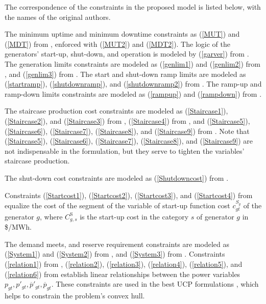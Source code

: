 The correspondence of the constraints in the proposed model is listed below, with the names of the original authors.



The minimum uptime and minimum downtime constraints as (\ref{MUT}) and (\ref{MDT}) from \citet{Rajan2005}, enforced with (\ref{MUT2}) and (\ref{MDT2}). The logic of the generators' start-up, shut-down, and operation is modeled by (\ref{garver}) from \citet{Garver1962}. The generation limits constraints are modeled as (\ref{genlim1}) and (\ref{genlim2}) from \citet{Gentile2017}, and (\ref{genlim3}) from \citet{Pan2016}. The start and shut-down ramp limits are modeled as (\ref{startramp}), (\ref{shutdownramp}), and (\ref{shutdownramp2}) from \citet{Morales-Espania2013}. The ramp-up and ramp-down limits constraints are modeled as (\ref{rampup}) and (\ref{rampdown}) from \citet{Damci-Kurt2016}.

The staircase production cost constraints are modeled as (\ref{Staircase1}), (\ref{Staircase2}), and (\ref{Staircase3}) from \citet{Garver1962}, (\ref{Staircase4}) from \citet{Wu2016}, and (\ref{Staircase5}), (\ref{Staircase6}), (\ref{Staircase7}), (\ref{Staircase8}), and (\ref{Staircase9}) from \citet{Knueven2018b}. Note that (\ref{Staircase5}), (\ref{Staircase6}), (\ref{Staircase7}), (\ref{Staircase8}), and (\ref{Staircase9}) are not indispensable in the formulation, but they serve to tighten the variables' staircase production.

The shut-down cost constraints are modeled as (\ref{Shutdowncost}) from \citet{Knueven2020b}.

Constraints (\ref{Startcost1}), (\ref{Startcost2}), (\ref{Startcost3}), and (\ref{Startcost4}) from \citet{Morales-Espania2013} equalize the cost of the segment of the variable of start-up function cost $c_{gt}^{S_g}$ of the generator $g$, where $C_{g,s}^{\text{S}}$ is the start-up cost in the category $s$ of generator $g$ in \$/MWh.

The demand meets, and reserve requirement constraints are modeled as (\ref{System1}) and (\ref{System2}) from \citet{Ostrowski2012}, and (\ref{System3}) from \citet{Morales-Espania2013}. Constraints (\ref{relation1}) from \citet{Morales-Espania2013}, (\ref{relation2}), (\ref{relation3}), (\ref{relation4}), (\ref{relation5}), and (\ref{relation6}) from \citet{Knueven2020b} establish linear relationships between the power variables 
$p_{gt}, p'_{gt}, \overline{p}'_{gt},\overline{p}_{gt}$. These constraints are used in the best UCP formulations \citep{Knueven2020b}, which helps to constrain the problem's convex hull.

